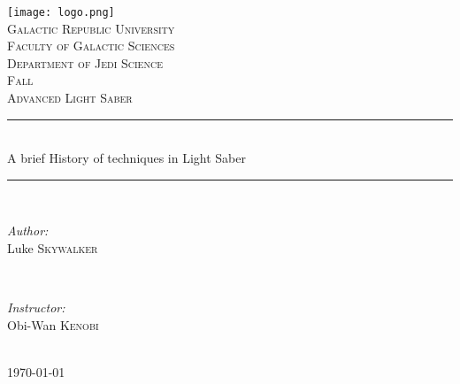 \documentclass[a4paper]{article}
\begin{document}
\begin{titlepage}

\newcommand{\HRule}{\rule{\linewidth}{0.5mm}} %
\center %

\texttt{[image: logo.png]}\\[0.5cm] %

\textsc{\LARGE Galactic Republic University}\\[0.5cm] %
\textsc{\Large Faculty of Galactic Sciences}\\[0.5cm] %
\textsc{\Large Department of Jedi Science}\\[0.5cm] %
\textsc{\Large Fall}\\[0.3cm] %
\textsc{\large Advanced Light Saber}\\[2.5cm] %

\HRule \\[0.4cm]
{\LARGE  A brief History of techniques in Light Saber}\\[0.2cm] %
\HRule \\[0.4cm]

\begin{minipage}{0.4\textwidth}
\begin{flushleft} \large
\emph{Author:}\\
Luke \textsc{Skywalker} %
\end{flushleft}
\end{minipage}
~
\begin{minipage}{0.4\textwidth}
\begin{flushright} \large
\emph{Instructor:} \\
Obi-Wan \textsc{Kenobi} %
\end{flushright}
\end{minipage}\\[6cm]

{\large \today}\\[3cm] %
 
\vfill %

\end{titlepage}


\tableofcontents
 
\newpage
\end{document}
